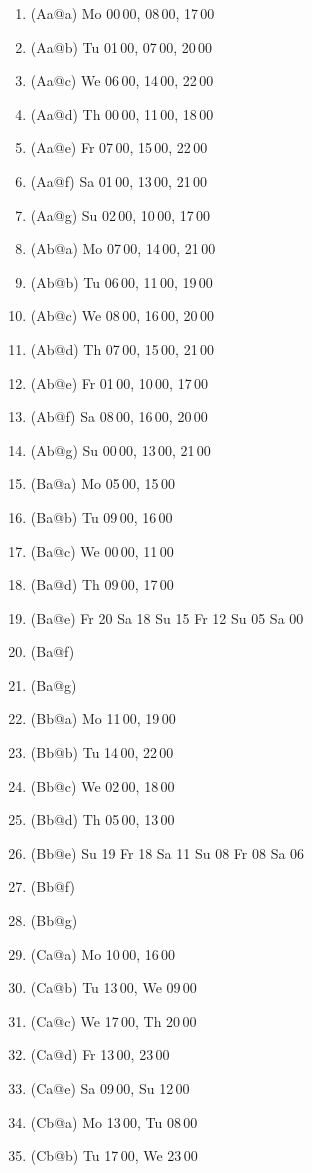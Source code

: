 \documentclass{article}
\begin{document}
\begin{enumerate}\itemsep 0pt\parskip 0pt
\item(Aa@a) Mo 00\,00, 08\,00, 17\,00
\item(Aa@b) Tu 01\,00, 07\,00, 20\,00
\item(Aa@c) We 06\,00, 14\,00, 22\,00
\item(Aa@d) Th 00\,00, 11\,00, 18\,00
\item(Aa@e) Fr 07\,00, 15\,00, 22\,00
\item(Aa@f) Sa 01\,00, 13\,00, 21\,00
\item(Aa@g) Su 02\,00, 10\,00, 17\,00
\item(Ab@a) Mo 07\,00, 14\,00, 21\,00
\item(Ab@b) Tu 06\,00, 11\,00, 19\,00
\item(Ab@c) We 08\,00, 16\,00, 20\,00
\item(Ab@d) Th 07\,00, 15\,00, 21\,00
\item(Ab@e) Fr 01\,00, 10\,00, 17\,00
\item(Ab@f) Sa 08\,00, 16\,00, 20\,00
\item(Ab@g) Su 00\,00, 13\,00, 21\,00
\item(Ba@a) Mo 05\,00, 15\,00
\item(Ba@b) Tu 09\,00, 16\,00
\item(Ba@c) We 00\,00, 11\,00
\item(Ba@d) Th 09\,00, 17\,00
\item(Ba@e) Fr 20 Sa 18 Su 15 Fr 12 Su 05 Sa 00
\item(Ba@f)
\item(Ba@g)
\item(Bb@a) Mo 11\,00, 19\,00
\item(Bb@b) Tu 14\,00, 22\,00
\item(Bb@c) We 02\,00, 18\,00
\item(Bb@d) Th 05\,00, 13\,00
\item(Bb@e) Su 19 Fr 18 Sa 11 Su 08 Fr 08 Sa 06
\item(Bb@f)
\item(Bb@g)
\item(Ca@a) Mo 10\,00, 16\,00
\item(Ca@b) Tu 13\,00, We 09\,00
\item(Ca@c) We 17\,00, Th 20\,00
\item(Ca@d) Fr 13\,00, 23\,00
\item(Ca@e) Sa 09\,00, Su 12\,00
\item(Cb@a) Mo 13\,00, Tu 08\,00
\item(Cb@b) Tu 17\,00, We 23\,00

\end{enumerate}
\end{document}
